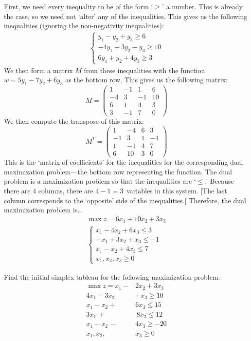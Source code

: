\documentclass[12pt,letterpaper]{exam}
\begin{document}
\begin{questions}
\sol First, we need every inequality to be of the form `$\geq$' a number. This is already the case, so we need not `alter' any of the inequalities. This gives us the following inequalities (ignoring the non-negativity inequalities):
	\[
	\begin{gathered}
	\begin{cases}
	y_1 - y_2 + y_3 \geq 6 \\
	-4y_1 + 3y_2 - y_3 \geq 10 \\
	6y_1 + y_2 + 4y_3 \geq 3
	\end{cases}
	\end{gathered}
	\]
We then form a matrix $M$ from these inequalities with the function $w= 5y_1 - 7y_2 + 6y_3$ as the bottom row. This gives us the following matrix: 
	\[
	M=
	\begin{pmatrix}
	1 & -1 & 1 & 6 \\
	-4 & 3 & -1 & 10 \\
	6 & 1 & 4 & 3 \\
	3 & -1 & 7 & 0
	\end{pmatrix}
	\]
We then compute the transpose of this matrix:
	\[
	M^T= 
	\begin{pmatrix}
	1 & -4 & 6 & 3 \\
	-1 & 3 & 1 & -1 \\
	1 & -1 & 4 & 7 \\
	6 & 10 & 3 & 0 
	\end{pmatrix}
	\]
This is the `matrix of coefficients' for the inequalities for the corresponding dual maximization problem---the bottom row representing the function. The dual problem is a maximization problem so that the inequalities are `$\leq$.' Because there are $4$ columns, there are $4 - 1= 3$~variables in this system. [The last column corresponds to the `opposite' side of the inequalities.] Therefore, the dual maximization problem is\dots
	\[
	\begin{gathered}
	\max z= 6x_1 + 10x_2 + 3x_3 \\
	\begin{cases}
	x_1 - 4x_2 + 6x_3 \leq 3 \\
	-x_1 + 3x_2 + x_3 \leq -1 \\
	x_1 - x_2 + 4x_3 \leq 7 \\
	x_1, x_2, x_3 \geq 0
	\end{cases}
	\end{gathered}
	\] 



\newpage
\question[10] Find the initial simplex tableau for the following maximization problem:
	\[
	\begin{aligned}
	\max z= x_1 - &2x_2 + 3x_3 \\
	4x_1 - 3x_2 &+ x_3 \geq 10 \\
	x_1 - x_2 + &6x_3 \leq 15 \\
	3x_1 \,+ &\,8x_2 \leq 12 \\
	x_1 - x_2 \,-\, &4x_3 \geq -20 \\
	x_1, x_2, \,&x_3 \geq 0 
	\end{aligned}
	\] 


\end{questions}
\end{document}
